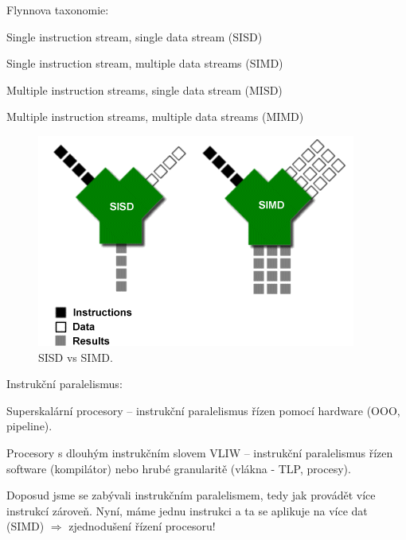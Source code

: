 \begin{compactitem}
    \item Flynnova taxonomie: \begin{compactitem}
        \item Single instruction stream, single data stream (SISD)
        \item Single instruction stream, multiple data streams (SIMD)
        \item Multiple instruction streams, single data stream (MISD)
        \item Multiple instruction streams, multiple data streams (MIMD)
    \end{compactitem}

    \begin{figure}[H]
        \centering
        \includegraphics[width=0.6\linewidth]{sisd_simd.png}
        \caption{SISD vs SIMD.}
    \end{figure}

    \item Instrukční paralelismus: \begin{compactitem}
        \item Superskalární procesory -- instrukční paralelismus řízen pomocí hardware (\break OOO, pipeline).
        \item Procesory s dlouhým instrukčním slovem VLIW -- instrukční paralelismus řízen software (kompilátor) nebo hrubé granularitě (vlákna - TLP, procesy).
    \end{compactitem}

    \item Doposud jsme se zabývali instrukčním paralelismem, tedy jak provádět více instrukcí zároveň. Nyní, máme jednu instrukci a ta se aplikuje na více dat (SIMD) $\Rightarrow$ zjednodušení řízení procesoru!
\end{compactitem}


